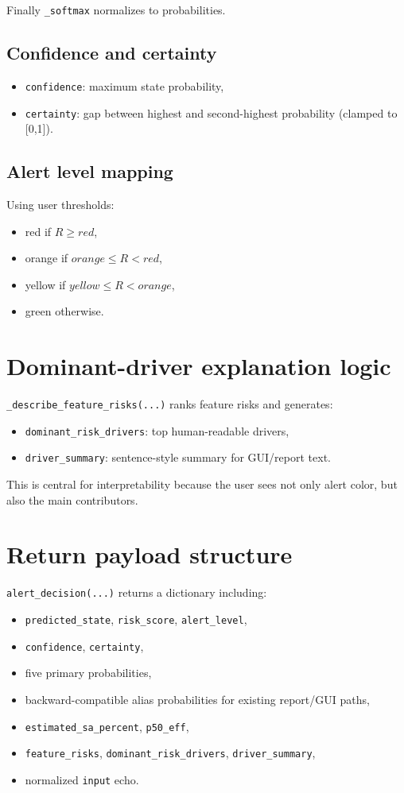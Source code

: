 \documentclass[12pt,a4paper]{article}
\begin{document}
Finally \texttt{\_softmax} normalizes to probabilities.

\subsection{Confidence and certainty}
\begin{itemize}
    \item \texttt{confidence}: maximum state probability,
    \item \texttt{certainty}: gap between highest and second-highest probability (clamped to [0,1]).
\end{itemize}

\subsection{Alert level mapping}
Using user thresholds:
\begin{itemize}
    \item red if $R\ge red$,
    \item orange if $orange\le R < red$,
    \item yellow if $yellow\le R < orange$,
    \item green otherwise.
\end{itemize}

\section{Dominant-driver explanation logic}
\texttt{\_describe\_feature\_risks(...)} ranks feature risks and generates:
\begin{itemize}
    \item \texttt{dominant\_risk\_drivers}: top human-readable drivers,
    \item \texttt{driver\_summary}: sentence-style summary for GUI/report text.
\end{itemize}

This is central for interpretability because the user sees not only alert color, but also the main contributors.

\section{Return payload structure}
\texttt{alert\_decision(...)} returns a dictionary including:
\begin{itemize}
    \item \texttt{predicted\_state}, \texttt{risk\_score}, \texttt{alert\_level},
    \item \texttt{confidence}, \texttt{certainty},
    \item five primary probabilities,
    \item backward-compatible alias probabilities for existing report/GUI paths,
    \item \texttt{estimated\_sa\_percent}, \texttt{p50\_eff},
    \item \texttt{feature\_risks}, \texttt{dominant\_risk\_drivers}, \texttt{driver\_summary},
    \item normalized \texttt{input} echo.
\end{itemize}
\end{document}
